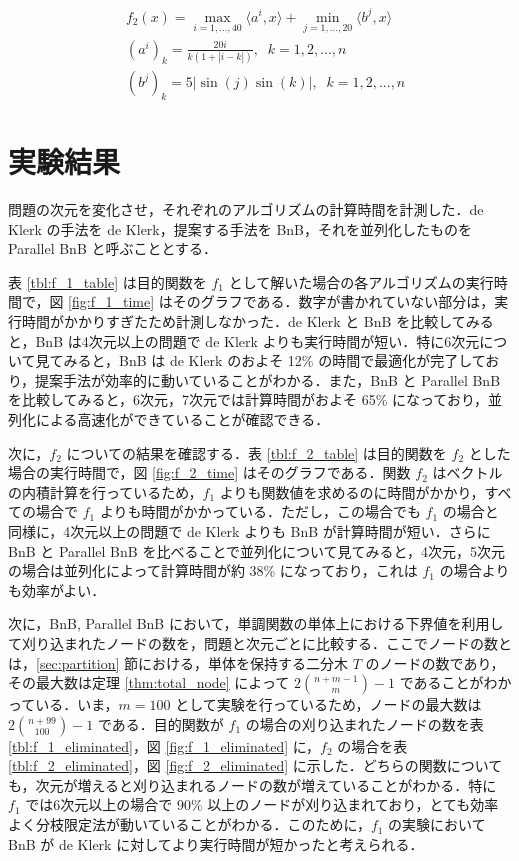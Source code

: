 \documentclass[a4paper,11pt]{jreport}
\begin{document}
\begin{align*}
& f_2(x) = \max_{i = 1, ..., 40} \langle a^i, x \rangle + \min_{j = 1, ..., 20} \langle b^j, x \rangle \\
& (a^i)_k = \frac{20i}{k(1 + | i - k |)}, \;\; k = 1, 2, ..., n \\
& (b^j)_k = 5 | \sin{(j)} \sin{(k)} |, \;\; k = 1, 2, ..., n
\end{align*}
\section{実験結果}

問題の次元を変化させ，それぞれのアルゴリズムの計算時間を計測した．de Klerk の手法を de Klerk，提案する手法を BnB，それを並列化したものを Parallel BnB と呼ぶこととする．\par
表 \ref{tbl:f_1_table} は目的関数を $ f_1 $ として解いた場合の各アルゴリズムの実行時間で，図 \ref{fig:f_1_time} はそのグラフである．数字が書かれていない部分は，実行時間がかかりすぎたため計測しなかった．de Klerk と BnB を比較してみると，BnB は4次元以上の問題で de Klerk よりも実行時間が短い．特に6次元について見てみると，BnB は de Klerk のおよそ 12\% の時間で最適化が完了しており，提案手法が効率的に動いていることがわかる．また，BnB と Parallel BnB を比較してみると，6次元，7次元では計算時間がおよそ 65\% になっており，並列化による高速化ができていることが確認できる．\par
次に，$ f_2 $ についての結果を確認する．表 \ref{tbl:f_2_table} は目的関数を $ f_2 $ とした場合の実行時間で，図 \ref{fig:f_2_time} はそのグラフである．関数 $ f_2 $ はベクトルの内積計算を行っているため，$ f_1 $ よりも関数値を求めるのに時間がかかり，すべての場合で $ f_1 $ よりも時間がかかっている．ただし，この場合でも $ f_1 $ の場合と同様に，4次元以上の問題で de Klerk よりも BnB が計算時間が短い．さらに BnB と Parallel BnB を比べることで並列化について見てみると，4次元，5次元の場合は並列化によって計算時間が約 38\% になっており，これは $ f_1 $ の場合よりも効率がよい．\par
次に，BnB, Parallel BnB において，単調関数の単体上における下界値を利用して刈り込まれたノードの数を，問題と次元ごとに比較する．ここでノードの数とは，\ref{sec:partition} 節における，単体を保持する二分木 $ T $ のノードの数であり，その最大数は定理 \ref{thm:total_node} によって $ 2 \binom{n + m - 1}{m} - 1 $ であることがわかっている．いま，$ m = 100 $ として実験を行っているため，ノードの最大数は $ 2 \binom{n + 99}{100} - 1 $ である．目的関数が $ f_1 $ の場合の刈り込まれたノードの数を表 \ref{tbl:f_1_eliminated}，図 \ref{fig:f_1_eliminated} に，$ f_2 $ の場合を表 \ref{tbl:f_2_eliminated}，図 \ref{fig:f_2_eliminated} に示した．どちらの関数についても，次元が増えると刈り込まれるノードの数が増えていることがわかる．特に $ f_1 $ では6次元以上の場合で 90\% 以上のノードが刈り込まれており，とても効率よく分枝限定法が動いていることがわかる．このために，$ f_1 $ の実験において BnB が de Klerk に対してより実行時間が短かったと考えられる．\par
\end{document}
